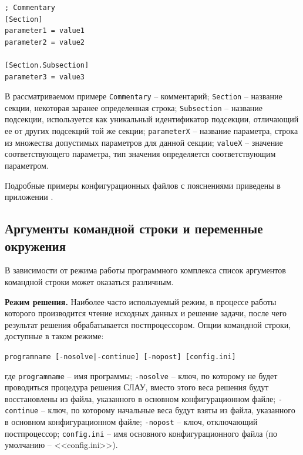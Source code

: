 \documentclass[a4paper,14pt]{article}
\newcommand{\CodeFont}[1]{{\small{\texttt{#1}}}}
\begin{document}
\vspace{-0.8cm}
\begin{singlespace}
\begin{footnotesize}
\begin{verbatim}
; Commentary
[Section]
parameter1 = value1
parameter2 = value2

[Section.Subsection]
parameter3 = value3
\end{verbatim}
\end{footnotesize}
\end{singlespace}
\vspace{-0.2cm}

\noindent В рассматриваемом примере \CodeFont{Commentary} -- комментарий; \CodeFont{Section} -- название секции, некоторая заранее определенная строка; \CodeFont{Subsection} -- название подсекции, используется как уникальный идентификатор подсекции, отличающий ее от других подсекций той же секции; \CodeFont{parameterX} -- название параметра, строка из множества допустимых параметров для данной секции; \CodeFont{valueX} -- значение соответствующего параметра, тип значения определяется соответствующим параметром.

Подробные примеры конфигурационных файлов с пояснениями приведены в приложении .

\subsection{Аргументы командной строки и переменные окружения}
В зависимости от режима работы программного комплекса список аргументов командной строки может оказаться различным.

\textbf{Режим решения.} Наиболее часто используемый режим, в процессе работы которого производится чтение исходных данных и решение задачи, после чего результат решения обрабатывается постпроцессором. Опции командной строки, доступные в таком режиме:

\CodeFont{programname [-nosolve|-continue] [-nopost] [config.ini]}

\noindent где \CodeFont{programname} -- имя программы; \CodeFont{-nosolve} -- ключ, по которому не будет проводиться процедура решения СЛАУ, вместо этого веса решения будут восстановлены из файла, указанного в основном конфигурационном файле; \CodeFont{-continue} -- ключ, по которому начальные веса будут взяты из файла, указанного в основном конфигурационном файле; \CodeFont{-nopost} -- ключ, отключающий постпроцессор; \CodeFont{config.ini} -- имя основного конфигурационного файла (по умолчанию -- <<config.ini>>).
\end{document}
